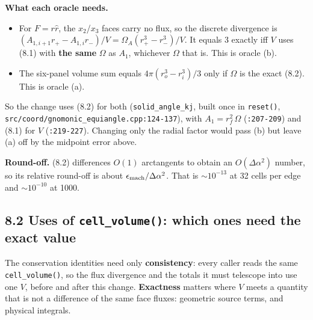 \documentclass[11pt,a4paper]{article}
\begin{document}
\textbf{What each oracle needs.}
\begin{itemize}
\item For $F=r\hat r$, the $x_2$/$x_3$ faces carry no flux, so the discrete divergence is
  $(A_{1,i+1}r_+ - A_{1,i}r_-)/V = \Omega_A(r_+^3-r_-^3)/V$. It equals 3 exactly iff $V$ uses
  (8.1) with \textbf{the same} $\Omega$ as $A_1$, whichever $\Omega$ that is. This is oracle (b).
\item The six-panel volume sum equals $4\pi(r_o^3-r_i^3)/3$ only if $\Omega$ is the exact (8.2). This
  is oracle (a).
\end{itemize}

So the change uses (8.2) for both (\texttt{solid\_angle\_kj}, built once in \texttt{reset()},
\texttt{src/coord/gnomonic\_equiangle.cpp:124-137}), with $A_1=r_f^2\,\Omega$ (\texttt{:207-209}) and (8.1)
for $V$ (\texttt{:219-227}). Changing only the radial factor would pass (b) but leave (a) off by the
midpoint error above.

\textbf{Round-off.} (8.2) differences $O(1)$ arctangents to obtain an $O(\Delta\alpha^2)$ number, so its
relative round-off is about $\epsilon_{\rm mach}/\Delta\alpha^2$. That is $\sim 10^{-13}$ at 32 cells
per edge and $\sim 10^{-10}$ at 1000.

\subsection*{8.2 Uses of \texttt{cell\_volume()}: which ones need the exact value}

The conservation identities need only \textbf{consistency}: every caller reads the same
\texttt{cell\_volume()}, so the flux divergence and the totals it must telescope into use one $V$, before
and after this change. \textbf{Exactness} matters where $V$ meets a quantity that is not a difference
of the same face fluxes: geometric source terms, and physical integrals.
\end{document}

